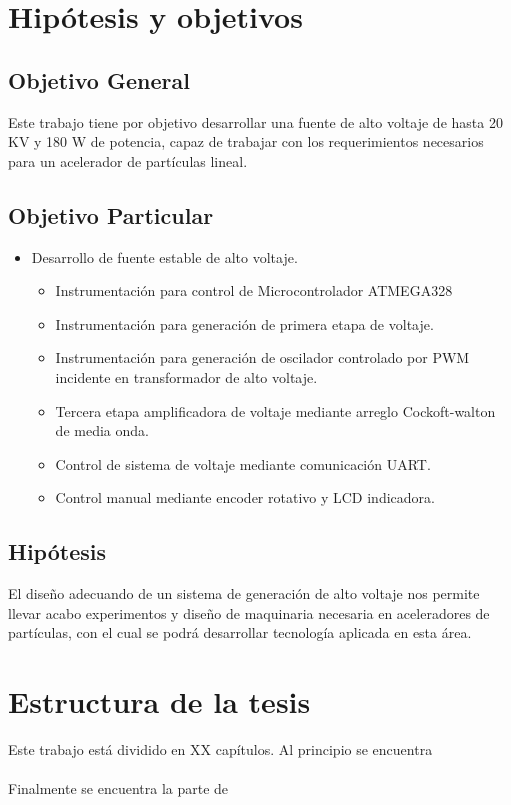 \section{Hipótesis y objetivos}

\subsection{Objetivo General}

Este trabajo tiene por objetivo desarrollar una fuente de alto voltaje de hasta 20 KV y 180 W de potencia, capaz de trabajar con los requerimientos necesarios para un acelerador de partículas lineal.

\subsection{Objetivo Particular}


\begin{itemize}
\item Desarrollo de fuente estable de alto voltaje.
\begin{itemize}
\item Instrumentación para control de Microcontrolador ATMEGA328
\item Instrumentación para generación de primera etapa de voltaje.
\item Instrumentación para generación de oscilador controlado por PWM incidente en transformador de alto voltaje.
\item Tercera etapa amplificadora de voltaje mediante arreglo Cockoft-walton de media onda.
\item Control de sistema de voltaje mediante comunicación UART.
\item Control manual mediante encoder rotativo y LCD indicadora.
\
\end{itemize}  
\end{itemize}

\subsection{Hipótesis}
El diseño adecuando de un sistema de generación de alto voltaje nos permite llevar acabo experimentos y diseño de maquinaria necesaria en aceleradores de partículas, con el cual se podrá desarrollar tecnología aplicada en esta área.


\section{Estructura de la tesis}

Este trabajo está dividido en XX capítulos. Al principio se encuentra 
\\\\
Finalmente se encuentra la parte de 